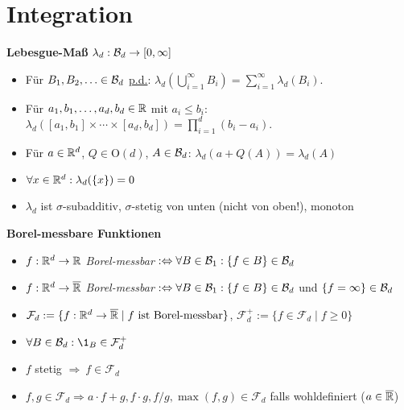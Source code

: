 \section{Integration}

\textbf{Lebesgue-Maß} $\lambda_d: \mathcal{B}_{d}\to [0,\infty]$
\begin{itemize}
\item Für $B_1,B_2,\ldots\in\mathcal{B}_{d}$ \underline{p.d.}:
$\lambda_d(\bigcup_{i=1}^{\infty} B_i)=\sum_{i=1}^{\infty}\lambda_d(B_i)$.

\item Für $a_1,b_1,\ldots,a_d,b_d\in\mathbb{R}$ mit $a_i\leq b_i$:\quad
\mbox{$\lambda_d([a_1,b_1]\times\cdots\times[a_d,b_d])=\prod_{i=1}^{d}(b_i-a_i).$}

\item Für $a\in\mathbb{R}^d$, $Q\in\mathrm{O}(d)$, $A\in\mathcal{B}_{d}$: 
$\lambda_d(a+Q(A))=\lambda_d(A)$

\item $\forall x\in\mathbb{R}^d: \lambda_d(\{x\})=0$

\item $\lambda_d$ ist $\sigma$-subadditiv, $\sigma$-stetig von unten
(nicht von oben!), monoton
\end{itemize}

\textbf{Borel-messbare Funktionen}
\begin{itemize}
\item $f:\mathbb{R}^d\to\mathbb{R}$ \textit{Borel-messbar}
$:\Leftrightarrow\forall B\in\mathcal{B}_{1}: \{f\in B\}\in\mathcal{B}_{d}$

\item $f:\mathbb{R}^d\to\overline{\mathbb{R}}$ \textit{Borel-messbar}
$:\Leftrightarrow\forall B\in\mathcal{B}_{1}: \{f\in B\}\in\mathcal{B}_{d}$ und $\{f=\infty\}\in\mathcal{B}_{d}$

\item $\mathcal{F}_d:=\{f:\mathbb{R}^d\to\overline{\mathbb{R}}\mid f \text{ ist Borel-messbar}\}$,
$\mathcal{F}_d^+ :=\{f\in\mathcal{F}_d\mid f\geq 0\}$

\item $\forall B\in\B{d}: \1_B\in\mathcal{F}_d^+$

\item $f$ stetig $\Rightarrow\ f\in\mathcal{F}_d$

\item $f,g\in\mathcal{F}_d\Rightarrow a\cdot f+g, f\cdot g, f/g,
\operatorname{max}(f,g)\in\mathcal{F}_d$ falls wohldefiniert ($a\in\overline{\mathbb{R}}$)
\end{itemize}

